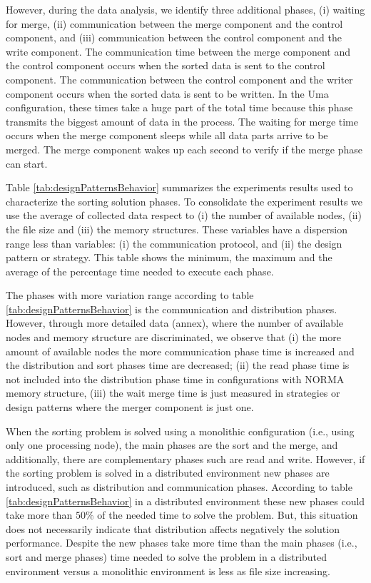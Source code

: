 However, during the data analysis, we identify three additional phases, (i) waiting for merge, (ii) communication between the merge component and the control component, and (iii) communication between the control component and the write component. The communication time between the merge component and the control component occurs when the sorted data is sent to the control component. The communication between the control component and the writer component occurs when the sorted data is sent to be written. In the Uma configuration, these times take a huge part of the total time because this phase transmits the biggest amount of data in the process. The waiting for merge time occurs when the merge component sleeps while all data parts arrive to be merged. The merge component wakes up each second to verify if the merge phase can start.

Table \ref{tab:designPatternsBehavior} summarizes the experiments results used to characterize the sorting solution phases. To consolidate the experiment results we use the average of collected data respect to (i) the number of available nodes, (ii) the file size and (iii) the memory structures. These variables have a dispersion range less than variables: (i) the communication protocol, and (ii) the design pattern or strategy. This table shows the minimum, the maximum and the average of the percentage time needed to execute each phase.

The phases with more variation range according to table \ref{tab:designPatternsBehavior} is the communication and distribution phases. However, through more detailed data (annex), where the number of available nodes and memory structure are discriminated, we observe that (i) the more amount of available nodes the more communication phase time is increased and the distribution and sort phases time are decreased; (ii) the read phase time is not included into the distribution phase time in configurations with NORMA memory structure, (iii) the wait merge time is just measured in strategies or design patterns where the merger component is just one.

When the sorting problem is solved using a monolithic configuration (i.e., using only one processing node), the main phases are the sort and the merge, and additionally, there are complementary phases such are read and write. However, if the sorting problem is solved in a distributed environment new phases are introduced, such as distribution and communication phases. According to table  \ref{tab:designPatternsBehavior} in a distributed environment these new phases could take more than $50\%$ of the needed time to solve the problem. But, this situation does not necessarily indicate that distribution affects negatively the solution performance. Despite the new phases take more time than the main phases (i.e., sort and merge phases) time needed to solve the problem in a distributed environment versus a monolithic environment is less as file size increasing.


